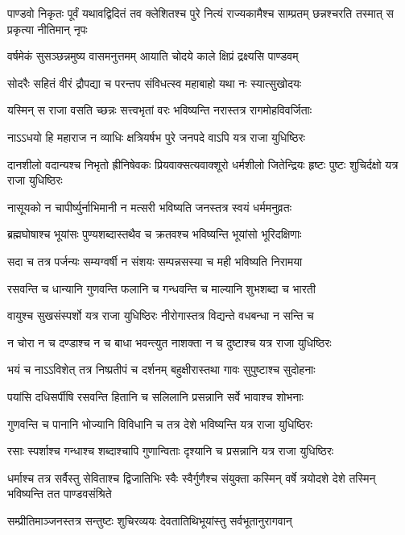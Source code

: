 \threelineshloka
{पाण्डवो निकृतः पूर्वं यथावद्विदितं तव}
{क्लेशितश्च पुरे नित्यं राज्यकामैश्च साम्प्रतम्}
{छन्नश्चरति तस्मात् स प्रकृत्या नीतिमान् नृपः}


\twolineshloka
{वर्षमेकं सुसञ्छन्नमुष्य वासमनुत्तमम्}
{आयाति चोदये काले क्षिप्रं द्रक्ष्यसि पाण्डवम्}


\twolineshloka
{सोदरैः सहितं वीरं द्रौपद्या च परन्तप}
{संविधत्स्व महाबाहो यथा नः स्यात्सुखोदयः}


\twolineshloka
{यस्मिन् स राजा वसति च्छन्नः सत्त्वभृतां वरः}
{भविष्यन्ति नरास्तत्र रागमोहविवर्जिताः}


\twolineshloka
{नाऽऽधयो हि महाराज न व्याधिः क्षत्रियर्षभ}
{पुरे जनपदे वाऽपि यत्र राजा युधिष्ठिरः}


\threelineshloka
{दानशीलो वदान्यश्च निभृतो ह्रीनिषेवकः}
{प्रियवाक्सत्यवाक्शूरो धर्मशीलो जितेन्द्रियः}
{हृष्टः पुष्टः शुचिर्दक्षो यत्र राजा युधिष्ठिरः}


\twolineshloka
{नासूयको न चापीर्ष्युर्नाभिमानी न मत्सरी}
{भविष्यति जनस्तत्र स्वयं धर्ममनुव्रतः}


\twolineshloka
{ब्रह्मघोषाश्च भूयांसः पुण्यशब्दास्तथैव च}
{क्रतवश्च भविष्यन्ति भूयांसो भूरिदक्षिणाः}


\twolineshloka
{सदा च तत्र पर्जन्यः सम्यग्वर्षी न संशयः}
{सम्पन्नसस्या च मही भविष्यति निरामया}


\twolineshloka
{रसवन्ति च धान्यानि गुणवन्ति फलानि च}
{गन्धवन्ति च माल्यानि शुभशब्दा च भारती}


\twolineshloka
{वायुश्च सुखसंस्पर्शो यत्र राजा युधिष्ठिरः}
{नीरोगास्तत्र विद्यन्ते वधबन्धा न सन्ति च}


\twolineshloka
{न चोरा न च दण्डाश्च न च बाधा भवन्त्युत}
{नाशक्ता न च दुष्टाश्च यत्र राजा युधिष्ठिरः}


\twolineshloka
{भयं च नाऽऽविशेत् तत्र निष्प्रतीपं च दर्शनम्}
{बहुक्षीरास्तथा गावः सुपुष्टाश्च सुदोहनाः}


\twolineshloka
{पयांसि दधिसर्पीषि रसवन्ति हितानि च}
{सलिलानि प्रसन्नानि सर्वे भावाश्च शोभनाः}


\twolineshloka
{गुणवन्ति च पानानि भोज्यानि विविधानि च}
{तत्र देशे भविष्यन्ति यत्र राजा युधिष्ठिरः}


\twolineshloka
{रसाः स्पर्शाश्च गन्धाश्च शब्दाश्चापि गुणान्विताः}
{दृश्यानि च प्रसन्नानि यत्र राजा युधिष्ठिरः}


\threelineshloka
{धर्माश्च तत्र सर्वैस्तु सेविताश्च द्विजातिभिः}
{स्वैः स्वैर्गुणैश्च संयुक्ता कस्मिन् वर्षे त्रयोदशे}
{देशे तस्मिन् भविष्यन्ति तत पाण्डवसंश्रिते}


\twolineshloka
{सम्प्रीतिमाञ्जनस्तत्र सन्तुष्टः शुचिरव्ययः}
{देवतातिथिभूयांस्तु सर्वभूतानुरागवान्}


